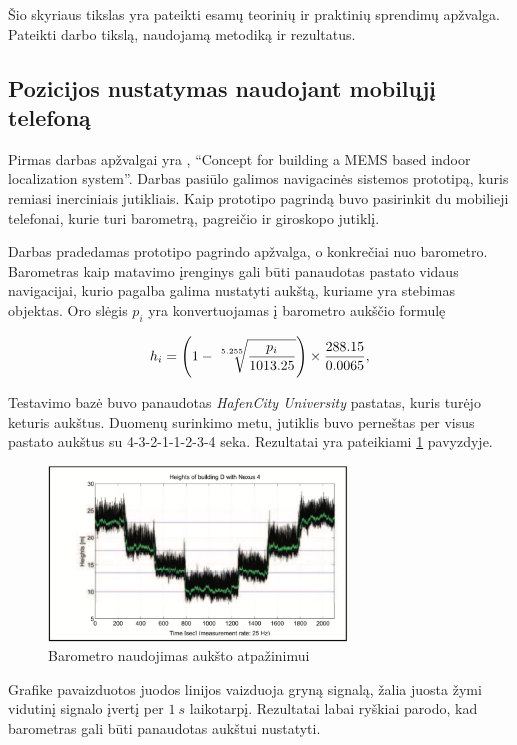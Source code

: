 Šio skyriaus tikslas yra pateikti esamų teorinių ir praktinių sprendimų apžvalga. Pateikti darbo tikslą, naudojamą metodiką ir rezultatus.

\subsection{Pozicijos nustatymas naudojant mobilųjį telefoną}

Pirmas darbas apžvalgai yra \cite{willemsenconcept}, ``Concept for building a MEMS based indoor localization system''. Darbas pasiūlo galimos navigacinės sistemos prototipą, kuris remiasi inerciniais jutikliais. Kaip prototipo pagrindą buvo pasirinkit du mobilieji telefonai, kurie turi barometrą, pagreičio ir giroskopo jutiklį.

Darbas pradedamas prototipo pagrindo apžvalga, o konkrečiai nuo barometro. Barometras kaip matavimo įrenginys gali būti panaudotas pastato vidaus navigacijai, kurio pagalba galima nustatyti aukštą, kuriame yra stebimas objektas. Oro slėgis $p_i$ yra konvertuojamas į barometro aukščio formulę

\begin{equation}
    h_i = \Bigg( 1 - \sqrt[\leftroot{-2}\uproot{2}5.255]{ \frac{p_i}{1013.25} } \Bigg) \times \frac{288.15}{0.0065},
\end{equation}

Testavimo bazė buvo panaudotas \textit{HafenCity University} pastatas, kuris turėjo keturis aukštus. Duomenų surinkimo metu, jutiklis buvo perneštas per visus pastato aukštus su 4-3-2-1-1-2-3-4 seka. Rezultatai yra pateikiami \ref{fig:floor_detection_with_barometer_data} pavyzdyje.

\begin{figure}[H]
    \centering
    \includegraphics[width=300px]{img/floor_detection_with_barometer_data.png}
    \caption{Barometro naudojimas aukšto atpažinimui \cite{willemsenconcept}}
    \label{fig:floor_detection_with_barometer_data}
\end{figure}

Grafike pavaizduotos juodos linijos vaizduoja gryną signalą, žalia juosta žymi vidutinį signalo įvertį per $1~s$ laikotarpį. Rezultatai labai ryškiai parodo, kad barometras gali būti panaudotas aukštui nustatyti.

